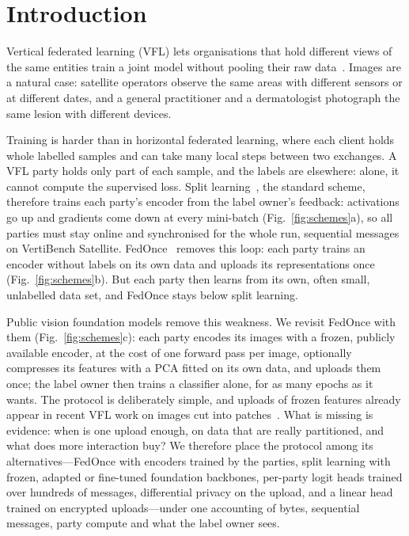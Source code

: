 \section{Introduction}\label{sec:intro}

Vertical federated learning (VFL) lets organisations that hold different views of the same entities train a joint model without pooling their raw data~\cite{liu2024vfl}. Images are a natural case: satellite operators observe the same areas with different sensors or at different dates, and a general practitioner and a dermatologist photograph the same lesion with different devices.

Training is harder than in horizontal federated learning, where each client holds whole labelled samples and can take many local steps between two exchanges. A VFL party holds only part of each sample, and the labels are elsewhere: alone, it cannot compute the supervised loss. Split learning~\cite{vepakomma2018splitnn}, the standard scheme, therefore trains each party's encoder from the label owner's feedback: activations go up and gradients come down at every mini-batch (Fig.~\ref{fig:schemes}a), so all parties must stay online and synchronised for the whole run, \frVbRoundsSplitNN{} sequential messages on VertiBench Satellite. FedOnce~\cite{wu2022fedonce} removes this loop: each party trains an encoder without labels on its own data and uploads its representations once (Fig.~\ref{fig:schemes}b). But each party then learns from its own, often small, unlabelled data set, and FedOnce stays below split learning.



Public vision foundation models remove this weakness. We revisit FedOnce with them (Fig.~\ref{fig:schemes}c): each party encodes its images with a frozen, publicly available encoder, at the cost of one forward pass per image, optionally compresses its features with a PCA fitted on its own data, and uploads them once; the label owner then trains a classifier alone, for as many epochs as it wants. The protocol is deliberately simple, and uploads of frozen features already appear in recent VFL work on images cut into patches~\cite{irureta2026splitmope,huang2026vafl,jin2026secure}. What is missing is evidence: when is one upload enough, on data that are really partitioned, and what does more interaction buy? We therefore place the protocol among its alternatives---FedOnce with encoders trained by the parties, split learning with frozen, adapted or fine-tuned foundation backbones, per-party logit heads trained over hundreds of messages, differential privacy on the upload, and a linear head trained on encrypted uploads---under one accounting of bytes, sequential messages, party compute and what the label owner sees.


